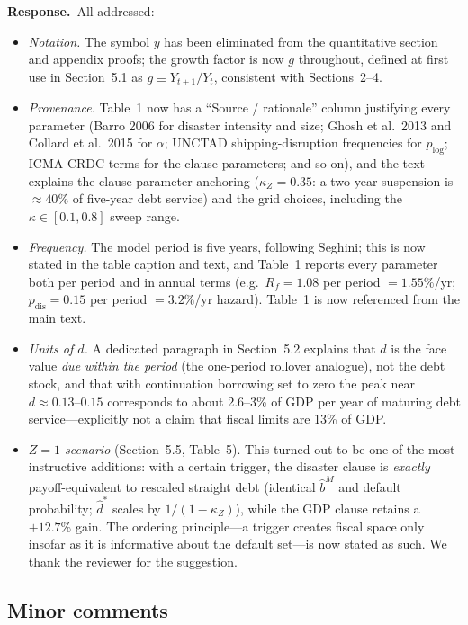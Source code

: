 \documentclass[11pt]{article}
\newcounter{comment}
\newcommand{\response}{\par\noindent\textbf{Response.}\ }
\begin{document}
\response All addressed:
\begin{itemize}
\item \emph{Notation.} The symbol $y$ has been eliminated from the quantitative section and appendix proofs; the growth factor is now $g$ throughout, defined at first use in Section~5.1 as $g \equiv Y_{t+1}/Y_t$, consistent with Sections~2--4.
\item \emph{Provenance.} Table~1 now has a ``Source / rationale'' column justifying every parameter (Barro 2006 for disaster intensity and size; Ghosh et al.\ 2013 and Collard et al.\ 2015 for $\alpha$; UNCTAD shipping-disruption frequencies for $p_{\log}$; ICMA CRDC terms for the clause parameters; and so on), and the text explains the clause-parameter anchoring ($\kappa_Z=0.35$: a two-year suspension is ${\approx}40\%$ of five-year debt service) and the grid choices, including the $\kappa\in[0.1,0.8]$ sweep range.
\item \emph{Frequency.} The model period is five years, following Seghini; this is now stated in the table caption and text, and Table~1 reports every parameter both per period and in annual terms (e.g.\ $R_f = 1.08$ per period $=1.55\%$/yr; $p_{\mathrm{dis}}=0.15$ per period $=3.2\%$/yr hazard). Table~1 is now referenced from the main text.
\item \emph{Units of $d$.} A dedicated paragraph in Section~5.2 explains that $d$ is the face value \emph{due within the period} (the one-period rollover analogue), not the debt stock, and that with continuation borrowing set to zero the peak near $d\approx0.13$--$0.15$ corresponds to about 2.6--3\% of GDP per year of maturing debt service---explicitly not a claim that fiscal limits are 13\% of GDP.
\item \emph{$Z=1$ scenario} (Section~5.5, Table~5). This turned out to be one of the most instructive additions: with a certain trigger, the disaster clause is \emph{exactly} payoff-equivalent to rescaled straight debt (identical $\widehat b^M$ and default probability; $\widehat d^*$ scales by $1/(1-\kappa_Z)$), while the GDP clause retains a $+12.7\%$ gain. The ordering principle---a trigger creates fiscal space only insofar as it is informative about the default set---is now stated as such. We thank the reviewer for the suggestion.
\end{itemize}

\subsection*{Minor comments}
\end{document}
